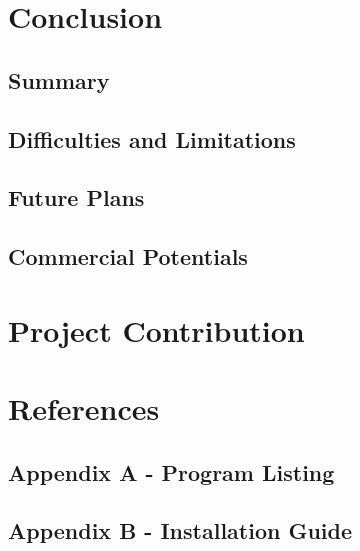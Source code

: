 \documentclass[12pt,a4paper]{article}
\begin{document}
    
    \section{Conclusion} 
        \subsection{Summary} %
        \subsection{Difficulties and Limitations} %
        \subsection{Future Plans} %
        \subsection{Commercial Potentials} %
    \clearpage
    
    
    \setcounter{page}{10} %
    
    \section*{Project Contribution}
    \clearpage
    
    
    \section*{References}
    \clearpage
    
    
    \subsection*{Appendix A - Program Listing}
    \clearpage
    
    \subsection*{Appendix B - Installation Guide}
    \clearpage
    
\end{document}
